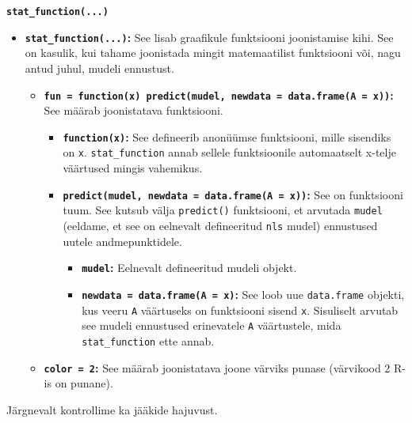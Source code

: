 \documentclass[
]{book}
\providecommand{\tightlist}{%
  \setlength{\itemsep}{0pt}\setlength{\parskip}{0pt}}
\theoremstyle{definition}
\theoremstyle{definition}
\theoremstyle{definition}
\theoremstyle{definition}
\theoremstyle{remark}
\begin{document}
\textbf{\texttt{stat\_function(...)}}

\begin{itemize}
\tightlist
\item
  \textbf{\texttt{stat\_function(...)}:} See lisab graafikule funktsiooni joonistamise kihi. See on kasulik, kui tahame joonistada mingit matemaatilist funktsiooni või, nagu antud juhul, mudeli ennustust.

  \begin{itemize}
  \tightlist
  \item
    \textbf{\texttt{fun\ =\ function(x)\ predict(mudel,\ newdata\ =\ data.frame(A\ =\ x))}:} See määrab joonistatava funktsiooni.

    \begin{itemize}
    \tightlist
    \item
      \textbf{\texttt{function(x)}:} See defineerib anonüümse funktsiooni, mille sisendiks on \texttt{x}. \texttt{stat\_function} annab sellele funktsioonile automaatselt x-telje väärtused mingis vahemikus.
    \item
      \textbf{\texttt{predict(mudel,\ newdata\ =\ data.frame(A\ =\ x))}:} See on funktsiooni tuum. See kutsub välja \texttt{predict()} funktsiooni, et arvutada \texttt{mudel} (eeldame, et see on eelnevalt defineeritud \texttt{nls} mudel) ennustused uutele andmepunktidele.

      \begin{itemize}
      \tightlist
      \item
        \textbf{\texttt{mudel}:} Eelnevalt defineeritud mudeli objekt.
      \item
        \textbf{\texttt{newdata\ =\ data.frame(A\ =\ x)}:} See loob uue \texttt{data.frame} objekti, kus veeru \texttt{A} väärtuseks on funktsiooni sisend \texttt{x}. Sisuliselt arvutab see mudeli ennustused erinevatele \texttt{A} väärtustele, mida \texttt{stat\_function} ette annab.
      \end{itemize}
    \end{itemize}
  \item
    \textbf{\texttt{color\ =\ 2}:} See määrab joonistatava joone värviks punase (värvikood 2 R-is on punane).
  \end{itemize}
\end{itemize}

Järgnevalt kontrollime ka jääkide hajuvust.
\end{document}
